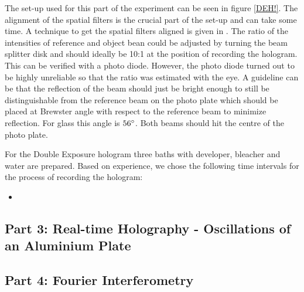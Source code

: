 The set-up used for this part of the experiment can be seen in figure \ref{DEH!}. The alignment of the spatial filters is the crucial part of the set-up and can take some time. A technique to get the spatial filters aligned is given in \cite{anleitung}.
The ratio of the intensities of reference and object bean could be adjusted by turning the beam splitter disk and should ideally be 10:1 at the position of recording the hologram. This can be verified with a photo diode. However, the photo diode turned out to be highly unreliable so that the ratio was estimated with the eye. A guideline can be that the reflection of the beam should just be bright enough to still be distinguishable from the reference beam on the photo plate which should be placed at Brewster angle with respect to the reference beam to minimize reflection. For glass this angle is $56 ^\circ$. Both beams should hit the centre of the photo plate.  

For the Double Exposure hologram three baths with developer, bleacher and water are prepared. Based on experience, we chose the following time intervals for the process of recording the hologram:

\begin{itemize}
	\item 
\end{itemize}



\subsection{Part 3: Real-time Holography - Oscillations of an Aluminium Plate \label{RTH}}

%
\subsection{Part 4: Fourier Interferometry \label{FI}}

